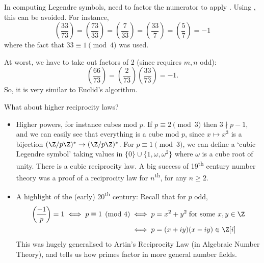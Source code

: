 \documentclass{article}
\newcommand{\legendre}[2]{\genfrac{(}{)}{}{}{#1}{#2}}
\begin{document}
In computing Legendre symbols, need to factor the numerator to apply .
Using , this can be avoided. For instance,
\begin{equation*}
    \legendre{33}{73} = \legendre{73}{33} = \legendre{7}{33} = \legendre{33}{7} = \legendre{5}{7} = -1
\end{equation*}
where the fact that $33 \equiv 1 \pmod{4}$ was used.

At worst, we have to take out factors of 2 (since  requires $m, n$ odd):
\begin{equation*}
    \legendre{66}{73} = \legendre{2}{73} \legendre{33}{73} = -1.
\end{equation*}
So, it is very similar to Euclid's algorithm.

What about higher reciprocity laws?
\begin{itemize}
    \item Higher powers, for instance cubes mod $p$.
        If $p \equiv 2 \pmod{3}$ then $3 \nmid p-1$, and we can easily see that everything is a cube mod $p$, since $x \mapsto x^3$ is a bijection $(\Z/p\Z)^* \to (\Z/p\Z)^*$.
        For $p \equiv 1 \pmod{3}$, we can define a `cubic Legendre symbol' taking values in $\{0\} \cup \{1, \omega, \omega^2\}$ where $\omega$ is a cube root of unity.
        There is a cubic reciprocity law.
        A big success of 19\textsuperscript{th} century number theory was a proof of a reciprocity law for $n$\textsuperscript{th}, for any $n \geq 2$.
    \item A highlight of the (early) 20\textsuperscript{th} century:
        Recall that for $p$ odd,
        \begin{align*}
            \legendre{-1}{p} = 1 \iff p \equiv 1 \pmod{4} &\iff p = x^2 + y^2 \; \text{for some } x, y \in \Z \\
            &\iff p = (x+iy)(x-iy) \in \Z[i]
        \end{align*}
        This was hugely generalised to Artin's Reciprocity Law (in Algebraic Number Theory), and tells us how primes factor in more general number fields.
\end{itemize}
\end{document}
